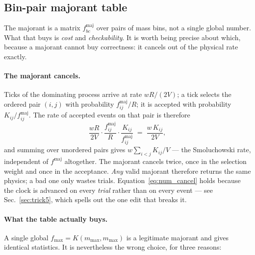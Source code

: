 \documentclass[a4paper,12pt]{article}
\newcommand{\fmaj}{f^{\mathrm{maj}}}
\begin{document}
\subsection{Bin-pair majorant table}
\label{sec:trick2}

The majorant is a matrix $\fmaj_{bc}$ over pairs of mass bins, not a single
global number. What that buys is \emph{cost} and \emph{checkability}. It is
worth being precise about which, because a majorant cannot buy correctness:
it cancels out of the physical rate exactly.

\paragraph{The majorant cancels.}
Ticks of the dominating process arrive at rate $wR/(2V)$; a tick selects the
ordered pair $(i,j)$ with probability $\fmaj_{ij}/R$; it is accepted with
probability $K_{ij}/\fmaj_{ij}$. The rate of accepted events on that pair is
therefore
\begin{equation}
  \frac{wR}{2V}\cdot\frac{\fmaj_{ij}}{R}\cdot\frac{K_{ij}}{\fmaj_{ij}}
  \;=\; \frac{w\,K_{ij}}{2V},
  \label{eq:num_cancel}
\end{equation}
and summing over unordered pairs gives $w\sum_{i<j}K_{ij}/V$ --- the
Smoluchowski rate, independent of $\fmaj$ altogether. The majorant cancels
twice, once in the selection weight and once in the acceptance. \emph{Any}
valid majorant therefore returns the same physics; a bad one only wastes
trials. Equation~\eqref{eq:num_cancel} holds because the clock is advanced on
every \emph{trial} rather than on every event --- see
Sec.~\ref{sec:trick5}, which spells out the one edit that breaks it.

\paragraph{What the table actually buys.}
A single global $f_{\max} = K(m_{\max},m_{\max})$ is a legitimate majorant and
gives identical statistics. It is nevertheless the wrong choice, for three
reasons:
\end{document}
